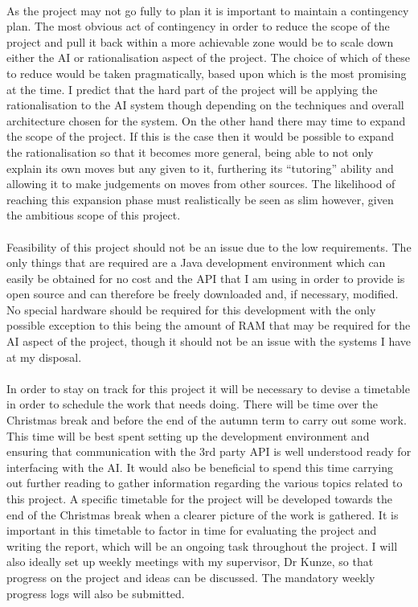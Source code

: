 \documentclass[]{article}
\begin{document}
\paragraph{}
As the project may not go fully to plan it is important to maintain a contingency plan. The most obvious act of contingency in order to reduce the scope of the project and pull it back within a more achievable zone would be to scale down either the AI or rationalisation aspect of the project. The choice of which of these to reduce would be taken pragmatically, based upon which is the most promising at the time. I predict that the hard part of the project will be applying the rationalisation to the AI system though depending on the techniques and overall architecture chosen for the system. On the other hand there may time to expand the scope of the project. If this is the case then it would be possible to expand the rationalisation so that it becomes more general, being able to not only explain its own moves but any given to it, furthering its ``tutoring'' ability and allowing it to make judgements on moves from other sources. The likelihood of reaching this expansion phase must realistically be seen as slim however, given the ambitious scope of this project.

\paragraph{}
Feasibility of this project should not be an issue due to the low requirements. The only things that are required are a Java development environment which can easily be obtained for no cost and the API that I am using in order to provide is open source and can therefore be freely downloaded and, if necessary, modified. No special hardware should be required for this development with the only possible exception to this being the amount of RAM that may be required for the AI aspect of the project, though it should not be an issue with the systems I have at my disposal.

\paragraph{}
In order to stay on track for this project it will be necessary to devise a timetable in order to schedule the work that needs doing. There will be time over the Christmas break and before the end of the autumn term to carry out some work. This time will be best spent setting up the development environment and ensuring that communication with the 3rd party API is well understood ready for interfacing with the AI. It would also be beneficial to spend this time carrying out further reading to gather information regarding the various topics related to this project. A specific timetable for the project will be developed towards the end of the Christmas break when a clearer picture of the work is gathered. It is important in this timetable to factor in time for evaluating the project and writing the report, which will be an ongoing task throughout the project. I will also ideally set up weekly meetings with my supervisor, Dr Kunze, so that progress on the project and ideas can be discussed. The mandatory weekly progress logs will also be submitted.
\end{document}
